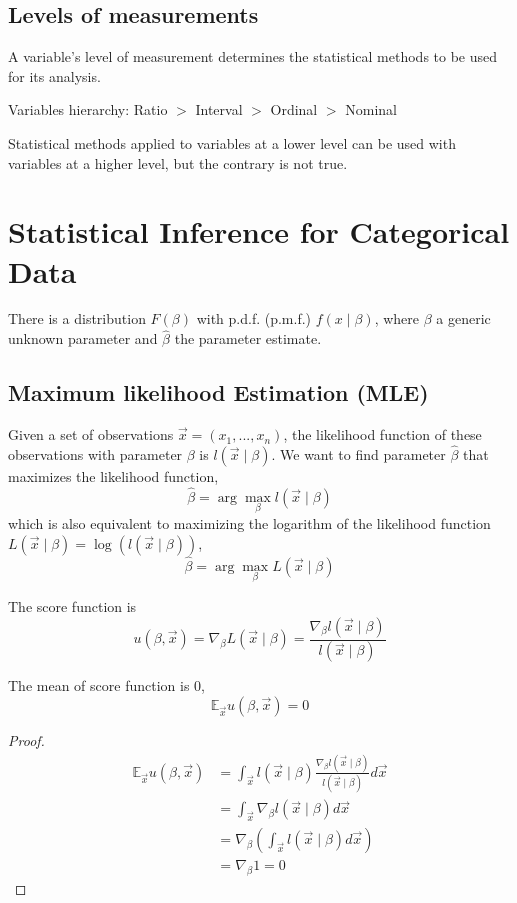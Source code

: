 \documentclass[11pt]{elegantbook}
\begin{document}
\subsection*{Levels of measurements}
A variable's level of measurement determines the statistical methods to be used for its analysis.
\begin{center}
    Variables hierarchy: Ratio $>$ Interval $>$ Ordinal $>$ Nominal
\end{center}
Statistical methods applied to variables at a lower level can be used with variables at a higher level, but the contrary is not true.

\section{Statistical Inference for Categorical Data}
There is a distribution $F(\beta)$ with p.d.f. (p.m.f.) $f(x\mid\beta)$, where $\beta$ a generic unknown parameter and $\hat{\beta}$ the parameter estimate.
\subsection{Maximum likelihood Estimation (MLE)}
Given a set of observations $\vec{x}=(x_1,...,x_n)$, the likelihood function of these observations with parameter $\beta$ is $l(\vec{x}\mid\beta)$. We want to find parameter $\hat{\beta}$ that maximizes the likelihood function,$$\hat{\beta}=\arg\max_{\beta} l(\vec{x}\mid\beta)$$
which is also equivalent to maximizing the logarithm of the likelihood function $L(\vec{x}\mid\beta) = \log(l(\vec{x}\mid\beta))$, $$\hat{\beta}=\arg\max_{\beta}L(\vec{x}\mid\beta)$$

\begin{definition}
    The score function is $$u(\beta,\vec{x})=\nabla_{\beta} L(\vec{x}\mid \beta)=\frac{\nabla_{\beta} l(\vec{x}\mid \beta)}{l(\vec{x}\mid \beta)}$$
\end{definition}
\begin{lemma}
    The mean of score function is $0$,
    $$\mathbb{E}_{\vec{x}}u(\beta,\vec{x})=0$$
\end{lemma}
\begin{proof}
    \begin{equation}
        \begin{aligned}
            \mathbb{E}_{\vec{x}}u(\beta,\vec{x})&=\int_{\vec{x}}l(\vec{x}\mid \beta)\frac{\nabla_{\beta} l(\vec{x}\mid \beta)}{l(\vec{x}\mid \beta)}d \vec{x}\\
            &=\int_{\vec{x}}\nabla_{\beta} l(\vec{x}\mid \beta)d \vec{x}\\
            &=\nabla_{\beta}\left(\int_{\vec{x}}l(\vec{x}\mid \beta)d \vec{x}\right)\\
            &=\nabla_{\beta}1=0
        \end{aligned}
        \nonumber
    \end{equation}
\end{proof}
\end{document}
